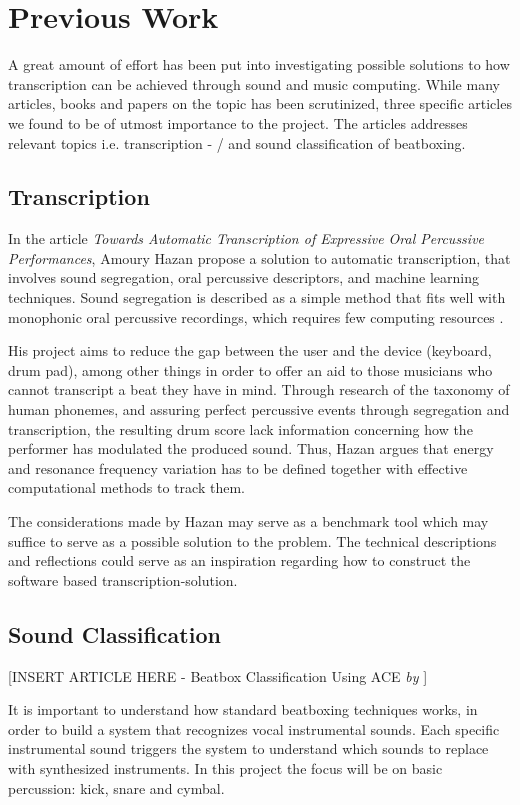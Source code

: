 \section{Previous Work}
A great amount of effort has been put into investigating possible solutions to how transcription can be achieved through sound and music computing. While many articles, books and papers on the topic has been scrutinized, three specific articles we found to be of utmost importance to the project. The articles addresses relevant topics i.e. transcription - / and sound classification of beatboxing.

\subsection{Transcription}
In the article \textit{Towards Automatic Transcription of Expressive Oral Percussive Performances}, Amoury Hazan propose a solution to automatic transcription, that involves sound segregation, oral percussive descriptors, and machine learning techniques. Sound segregation is described as a simple method that fits well with monophonic oral percussive recordings, which requires few computing resources \citep{Hazan2005a}.	

His project aims to reduce the gap between the user and the device (keyboard, drum pad), among other things in order to offer an aid to those musicians who cannot transcript a beat they have in mind.
Through research of the taxonomy of human phonemes, and assuring perfect percussive events through segregation and transcription, the resulting drum score lack information concerning how the performer has modulated the produced sound. Thus, Hazan argues that energy and resonance frequency variation has to be defined together with effective computational methods to track them.
	
The considerations made by Hazan may serve as a benchmark tool which may suffice to serve as a possible solution to the problem. The technical descriptions and reflections could serve as an inspiration regarding how to construct the software based transcription-solution.

\subsection{Sound Classification}

[INSERT ARTICLE HERE - Beatbox Classification Using ACE \textit{by} \citep{Sinyor05} ]

It is important to understand how standard beatboxing techniques works, in order to build a system that recognizes vocal instrumental sounds. Each specific instrumental sound triggers the system to understand which sounds to replace with synthesized instruments. In this project the focus will be on basic percussion: kick, snare and cymbal.

